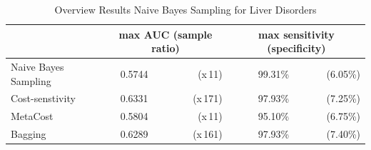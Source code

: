 \begin{table}[h]
\centering  
\begin{tabular}{ l | c r | r r|}                                      
& \multicolumn{2}{c}{max AUC (sample ratio)} & \multicolumn{2}{c}{max sensitivity (specificity)} \\
\hline 
Naive Bayes Sampling & 0.5744 & (x\,11) & 99.31\% & (6.05\%)\\
Cost-senstivity & 0.6331 & (x\,171) & 97.93\% & (7.25\%)\\
MetaCost & 0.5804 & (x\,11) & 95.10\% & (6.75\%)\\
Bagging & 0.6289 & (x\,161) & 97.93\% & (7.40\%)\\
\hline                 
\end{tabular}
\label{tab:PPer}
\caption{Overview Results Naive Bayes Sampling for Liver Disorders} 
\end{table}





